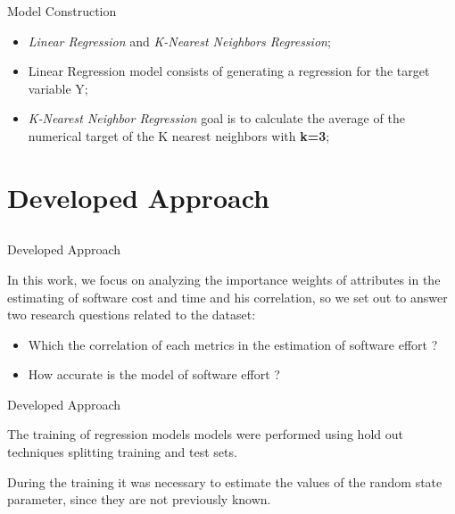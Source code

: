 \documentclass{beamer}
\begin{document}
\begin{frame}{Model Construction}
	\begin{block}{}
		\begin{itemize}[<+->]
            \item \textit{Linear Regression} and \textit{K-Nearest Neighbors Regression};
			\item Linear Regression model consists of generating a regression for the target variable Y;
            \item \textit{K-Nearest Neighbor Regression} goal is to calculate the average of the numerical target of the K nearest neighbors with \textbf{k=3};
		\end{itemize}
	\end{block}
\end{frame}


\section{Developed Approach}
\subsection{}

\begin{frame}{Developed Approach}
	\begin{block}{}
      In this work, we focus on analyzing the importance weights of attributes in the estimating of software cost and time and his correlation, so we set out to answer two research questions related to the dataset:
      \begin{itemize}[<+->]
			\item Which the correlation of each metrics in the estimation of software effort ?
            \item How accurate is the model of software effort ?
		\end{itemize}
	\end{block}
	
\end{frame}

\begin{frame}{Developed Approach}
	\begin{block}{}
      The training of regression models models were performed using hold out techniques splitting training and test sets.
	\end{block}
    
    \begin{block}{}
    During the training it was necessary to estimate the values of the random state parameter, since they are not previously known.
    \end{block}
	
\end{frame}
\end{document}
